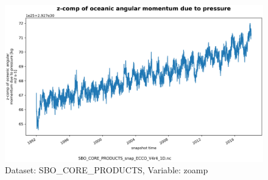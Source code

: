 \begin{figure}[H]
\centering
\includegraphics[scale=0.55]{../images/plots/oneD_plots/SBO_Core_Products/zoamp.png}
\caption{Dataset: SBO\_CORE\_PRODUCTS, Variable: zoamp}
\label{tab:table-SBO_CORE_PRODUCTS_zoamp-Plot}
\end{figure}
\newpage
\pagebreak
